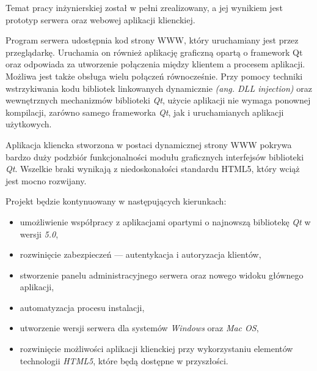 Temat pracy inżynierskiej został w pełni zrealizowany, a jej wynikiem jest prototyp serwera oraz webowej aplikacji klienckiej. 

Program serwera udostępnia kod strony WWW, który uruchamiany jest przez przeglądarkę. Uruchamia on również aplikację graficzną opartą o framework Qt oraz odpowiada za utworzenie połączenia między klientem a procesem aplikacji. Możliwa jest także obsługa wielu połączeń równocześnie. 
Przy pomocy techniki wstrzykiwania kodu bibliotek linkowanych dynamicznie \emph{(ang. DLL injection)} oraz wewnętrznych mechanizmów biblioteki \emph{Qt}, użycie aplikacji nie wymaga ponownej kompilacji, zarówno samego frameworka \emph{Qt}, jak i uruchamianych aplikacji użytkowych.

Aplikacja kliencka stworzona w postaci dynamicznej strony WWW pokrywa bardzo duży podzbiór funkcjonalności modułu graficznych interfejsów biblioteki \emph{Qt}. Wszelkie braki wynikają z niedoskonałości standardu HTML5, który wciąż jest mocno rozwijany.

Projekt będzie kontynuowany w następujących kierunkach:
\begin{itemize}
  \item umożliwienie współpracy z aplikacjami opartymi o najnowszą bibliotekę \emph{Qt} w wersji \emph{5.0},
  \item rozwinięcie zabezpieczeń --- autentykacja i autoryzacja klientów,
  \item stworzenie panelu administracyjnego serwera oraz nowego widoku głównego aplikacji,
  \item automatyzacja procesu instalacji,
  \item utworzenie wersji serwera dla systemów \emph{Windows} oraz \emph{Mac OS},
  \item rozwinięcie możliwości aplikacji klienckiej przy wykorzystaniu elementów technologii \emph{HTML5}, które będą dostępne w przyszłości.
\end{itemize}
